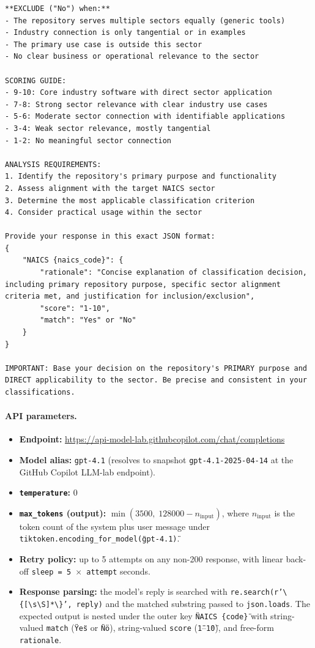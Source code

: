 \begin{Verbatim}[fontsize=\footnotesize,breaklines=true,breakanywhere=true,breakindent=0pt,breaksymbolleft={\textcolor{gray}{\tiny$\hookrightarrow$}},frame=single,framesep=2mm,xleftmargin=0pt,xrightmargin=0pt]
**EXCLUDE ("No") when:**
- The repository serves multiple sectors equally (generic tools)
- Industry connection is only tangential or in examples
- The primary use case is outside this sector
- No clear business or operational relevance to the sector

SCORING GUIDE:
- 9-10: Core industry software with direct sector application
- 7-8: Strong sector relevance with clear industry use cases
- 5-6: Moderate sector connection with identifiable applications
- 3-4: Weak sector relevance, mostly tangential
- 1-2: No meaningful sector connection

ANALYSIS REQUIREMENTS:
1. Identify the repository's primary purpose and functionality
2. Assess alignment with the target NAICS sector
3. Determine the most applicable classification criterion
4. Consider practical usage within the sector

Provide your response in this exact JSON format:
{
    "NAICS {naics_code}": {
        "rationale": "Concise explanation of classification decision, including primary repository purpose, specific sector alignment criteria met, and justification for inclusion/exclusion",
        "score": "1-10",
        "match": "Yes" or "No"
    }
}

IMPORTANT: Base your decision on the repository's PRIMARY purpose and DIRECT applicability to the sector. Be precise and consistent in your classifications.
\end{Verbatim}

\paragraph{API parameters.}
\begin{itemize}
  \item \textbf{Endpoint:} \url{https://api-model-lab.githubcopilot.com/chat/completions}
  \item \textbf{Model alias:} \texttt{gpt-4.1} (resolves to snapshot \texttt{gpt-4.1-2025-04-14} at the GitHub Copilot LLM-lab endpoint).
  \item \textbf{\texttt{temperature}:} 0
  \item \textbf{\texttt{max\_tokens} (output):} $\min(3500,\; 128000 - n_{\text{input}})$, where $n_{\text{input}}$ is the token count of the system plus user message under \texttt{tiktoken.encoding\_for\_model(\"gpt-4.1\")}.
  \item \textbf{Retry policy:} up to 5 attempts on any non-200 response, with linear back-off \texttt{sleep = 5 $\times$ attempt} seconds.
  \item \textbf{Response parsing:} the model's reply is searched with \texttt{re.search(r'\textbackslash\{[\textbackslash s\textbackslash S]*\textbackslash\}', reply)} and the matched substring passed to \texttt{json.loads}. The expected output is nested under the outer key \texttt{\"NAICS \{code\}\"} with string-valued \texttt{match} (\texttt{\"Yes\"} or \texttt{\"No\"}), string-valued \texttt{score} (\texttt{\"1\"}--\texttt{\"10\"}), and free-form \texttt{rationale}.
\end{itemize}
